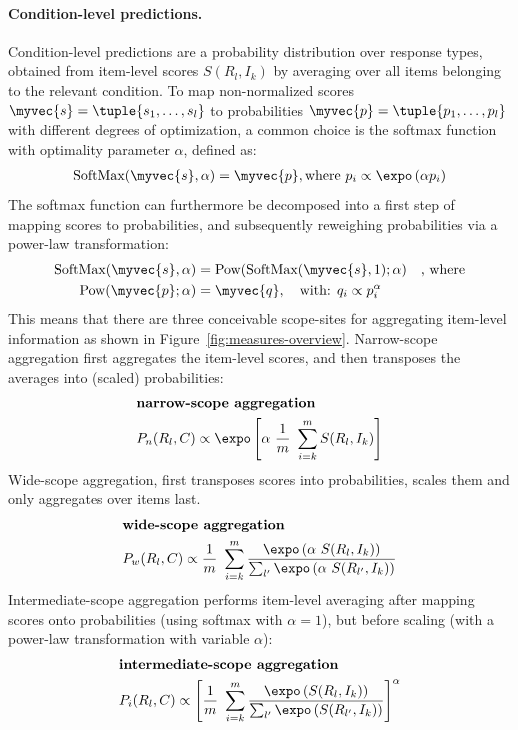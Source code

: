 \documentclass{article}
\begin{document}
\paragraph{Condition-level predictions.}
Condition-level predictions are a probability distribution over response types, obtained from item-level scores $S(R_{l}, I_{k})$ by averaging over all items belonging to the relevant condition.
To map non-normalized scores $\myvec{s} = \tuple{s_{1}, \dots, s_{l}}$ to probabilities $\myvec{p} = \tuple{p_{1}, \dots, p_{l}}$ with different degrees of optimization, a common choice is the softmax function with optimality parameter $\alpha$, defined as:
%
\begin{align*}
 \text{SoftMax}(\myvec{s}, \alpha) = \myvec{p}, \text{where } p_{i} \propto \expo \left (\alpha p_{i} \right )
\end{align*}
%
The softmax function can furthermore be decomposed into a first step of mapping scores to probabilities, and subsequently reweighing probabilities via a power-law transformation:
%
\begin{align*}
  \text{SoftMax}(\myvec{s}, \alpha) & = \text{Pow}( \text{SoftMax}(\myvec{s}, 1) ; \alpha) \ \ \  \text{, where} \\
  \text{Pow}(\myvec{p} ; \alpha) & = \myvec{q}, \ \ \ \text{with: } q_{i} \propto p_{i}^{\alpha}
\end{align*}
%
This means that there are three conceivable scope-sites for aggregating item-level information as shown in Figure~\ref{fig:measures-overview}.
Narrow-scope aggregation first aggregates the item-level scores, and then transposes the averages into (scaled) probabilities:
%
\begin{align*}
  & \textbf{narrow-scope aggregation} \\
  & P_{n}(R_{l}, C) \propto \expo \left [  \alpha \ \frac{1}{m} \ \sum_{i = k}^{m} S(R_{l}, I_{k})  \right ]
\end{align*}
%
Wide-scope aggregation, first transposes scores into probabilities, scales them and only aggregates over items last.
\begin{align*}
  & \textbf{wide-scope aggregation} \\
  & P_{w}(R_{l}, C) \propto \frac{1}{m} \ \sum_{i = k}^{m} \frac{\expo \left( \alpha \ S(R_{l}, I_{k}) \right )}{ \sum_{l'} \expo \left( \alpha \ S(R_{l'}, I_{k}) \right )}
\end{align*}
%
Intermediate-scope aggregation performs item-level averaging after mapping scores onto probabilities (using softmax with $\alpha=1$), but before scaling (with a power-law transformation with variable $\alpha$):
\begin{align*}
  & \textbf{intermediate-scope aggregation} \\
  & P_{i}(R_{l}, C) \propto  \left [ \frac{1}{m} \ \sum_{i = k}^{m} \frac{\expo \left( S(R_{l}, I_{k}) \right )}{ \sum_{l'} \expo \left( S(R_{l'}, I_{k}) \right )} \right ]^{\alpha}
\end{align*}
%
\end{document}
